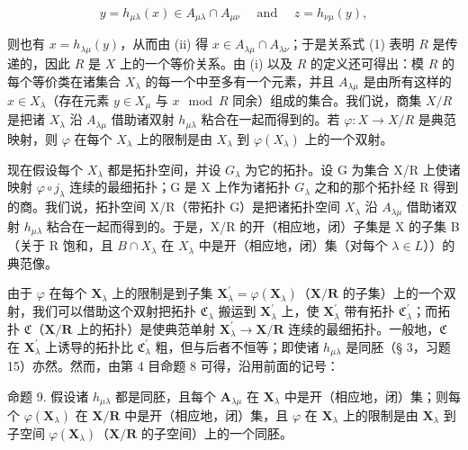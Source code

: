 \[
y = h _ {\mu \lambda} (x) \in A _ {\mu \lambda} \cap A _ {\mu \nu} \quad \text { and } \quad z = h _ {\nu \mu} (y),
\]

则也有 \(x = h_{\lambda \mu}(y)\)，从而由 (ii) 得 \(x \in A_{\lambda \mu} \cap A_{\lambda \nu}\)；于是关系式 (1) 表明 \(R\) 是传递的，因此 \(R\) 是 \(X\) 上的一个等价关系。由 (i) 以及 \(R\) 的定义还可得出：模 \(R\) 的每个等价类在诸集合 \(X_{\lambda}\) 的每一个中至多有一个元素，并且 \(A_{\lambda \mu}\) 是由所有这样的 \(x \in X_{\lambda}\)（存在元素 \(y \in X_{\mu}\) 与 \(x \mod R\) 同余）组成的集合。我们说，商集 \(X / R\) 是把诸 \(X_{\lambda}\) 沿 \(A_{\lambda \mu}\) 借助诸双射 \(h_{\mu \lambda}\) 粘合在一起而得到的。若 \(\varphi: X \to X / R\) 是典范映射，则 \(\varphi\) 在每个 \(X_{\lambda}\) 上的限制是由 \(X_{\lambda}\) 到 \(\varphi(X_{\lambda})\) 上的一个双射。

现在假设每个 \(X_{\lambda}\) 都是拓扑空间，并设 \(G_{\lambda}\) 为它的拓扑。设 G 为集合 X/R 上使诸映射 \(\varphi \circ j_{\lambda}\) 连续的最细拓扑；G 是 X 上作为诸拓扑 \(G_{\lambda}\) 之和的那个拓扑经 R 得到的商。我们说，拓扑空间 X/R（带拓扑 G）是把诸拓扑空间 \(X_{\lambda}\) 沿 \(A_{\lambda\mu}\) 借助诸双射 \(h_{\mu\lambda}\) 粘合在一起而得到的。于是，X/R 的开（相应地，闭）子集是 X 的子集 B（关于 R 饱和，且 \(B \cap X_{\lambda}\) 在 \(X_{\lambda}\) 中是开（相应地，闭）集（对每个 \(\lambda \in L\)））的典范像。

由于 \(\varphi\) 在每个 \(\mathbf{X}_{\lambda}\) 上的限制是到子集 \(\mathbf{X}_{\lambda}^{\prime} = \varphi (\mathbf{X}_{\lambda})\)（\(\mathbf{X} / \mathbf{R}\) 的子集）上的一个双射，我们可以借助这个双射把拓扑 \(\mathfrak{C}_{\lambda}\) 搬运到 \(\mathbf{X}_{\lambda}^{\prime}\) 上，使 \(\mathbf{X}_{\lambda}^{\prime}\) 带有拓扑 \(\mathfrak{C}_{\lambda}^{\prime}\)；而拓扑 \(\mathfrak{C}\)（\(\mathbf{X} / \mathbf{R}\) 上的拓扑）是使典范单射 \(\mathbf{X}_{\lambda}^{\prime} \to \mathbf{X} / \mathbf{R}\) 连续的最细拓扑。一般地，\(\mathfrak{C}\) 在 \(\mathbf{X}_{\lambda}^{\prime}\) 上诱导的拓扑比 \(\mathfrak{C}_{\lambda}^{\prime}\) 粗，但与后者不恒等；即使诸 \(h_{\mu \lambda}\) 是同胚（§ 3，习题 15）亦然。然而，由第 4 目命题 8 可得，沿用前面的记号：

命题 9. 假设诸 \(h_{\mu \lambda}\) 都是同胚，且每个 \(\mathbf{A}_{\lambda \mu}\) 在 \(\mathbf{X}_{\lambda}\) 中是开（相应地，闭）集；则每个 \(\varphi(\mathbf{X}_{\lambda})\) 在 \(\mathbf{X}/\mathbf{R}\) 中是开（相应地，闭）集，且 \(\varphi\) 在 \(\mathbf{X}_{\lambda}\) 上的限制是由 \(\mathbf{X}_{\lambda}\) 到子空间 \(\varphi(\mathbf{X}_{\lambda})\)（\(\mathbf{X}/\mathbf{R}\) 的子空间）上的一个同胚。

